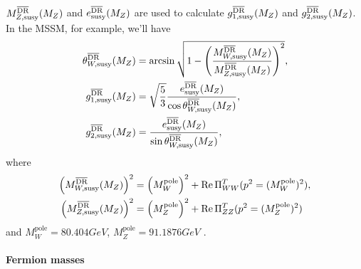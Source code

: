 $M_{Z,\text{susy}}^{\text{$\overline{\mbox{DR}}$}}(M_Z)$ and
$e_{\text{susy}}^{\text{$\overline{\mbox{DR}}$}}(M_Z)$ are used to calculate
$g_{1,\text{susy}}^{\text{$\overline{\mbox{DR}}$}}(M_Z)$ and
$g_{2,\text{susy}}^{\text{$\overline{\mbox{DR}}$}}(M_Z)$.  In the MSSM, for example,
we'll have
%
\begin{align}
  \theta_{W,\text{susy}}^{\text{$\overline{\mbox{DR}}$}}(M_Z) &=
  \arcsin\sqrt{1 - \left(\frac{M_{W,\text{susy}}^{\text{$\overline{\mbox{DR}}$}}(M_Z)}{M_{Z,\text{susy}}^{\text{$\overline{\mbox{DR}}$}}(M_Z)}\right)^2} ,\\
  g_{1,\text{susy}}^{\text{$\overline{\mbox{DR}}$}}(M_Z) &=
  \sqrt{\frac{5}{3}} \frac{e_{\text{susy}}^{\text{$\overline{\mbox{DR}}$}}(M_Z)}{\cos\theta_{W,\text{susy}}^{\text{$\overline{\mbox{DR}}$}}(M_Z)} ,\\
  g_{2,\text{susy}}^{\text{$\overline{\mbox{DR}}$}}(M_Z) &=
  \frac{e_{\text{susy}}^{\text{$\overline{\mbox{DR}}$}}(M_Z)}{\sin\theta_{W,\text{susy}}^{\text{$\overline{\mbox{DR}}$}}(M_Z)} ,
\end{align}
%
where
%
\begin{align}
  \left(M_{W,\text{susy}}^{\text{$\overline{\mbox{DR}}$}}(M_Z)\right)^2 &=
  \left(M_W^{\text{pole}}\right)^2 + \operatorname{Re} \Pi_{WW}^T(p^2 = (M_W^{\text{pole}})^2) ,\\
  \left(M_{Z,\text{susy}}^{\text{$\overline{\mbox{DR}}$}}(M_Z)\right)^2 &=
  \left(M_Z^{\text{pole}}\right)^2 + \operatorname{Re} \Pi_{ZZ}^T(p^2 = (M_Z^{\text{pole}})^2)
\end{align}
%
and $M_W^{\text{pole}} = 80.404\unit{GeV}$, $M_Z^{\text{pole}} =
91.1876\unit{GeV}$ \cite{Beringer:1900zz}.

\paragraph{Fermion masses}

